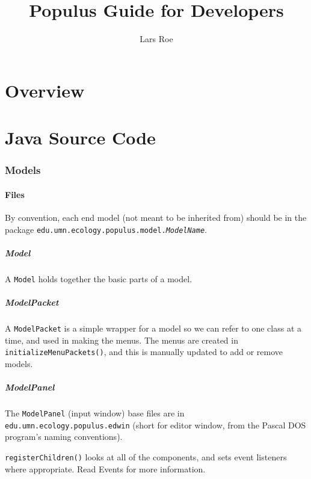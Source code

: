 \documentclass[12pt]{article}
\title{Populus Guide for Developers}
\author{Lars Roe}
\begin{document}
\maketitle
\newpage

\tableofcontents
\newpage

\part{Overview}

\part{Java Source Code}

\section{Models}

\subsection{Files}
By convention, each end model (not meant to be inherited from) should be in the package \texttt{edu.umn.ecology.populus.model.\textit{ModelName}}.

\subsubsection{Model}
A \texttt{Model} holds together the basic parts of a model.

\subsubsection{ModelPacket}
A \texttt{ModelPacket}  is a simple wrapper for a model so we can refer to one class at a time, and used in making the menus.  The menus are created in \texttt{initializeMenuPackets()}, and this is manually updated to add or remove models.


\subsubsection{ModelPanel}
The \texttt{ModelPanel}  (input window) base files are in \texttt{edu.umn.ecology.populus.edwin}  (short for editor window, from the Pascal DOS program's naming conventions).

\texttt{registerChildren()} looks at all of the components, and sets event listeners where appropriate.  Read Events for more information.
\end{document}
